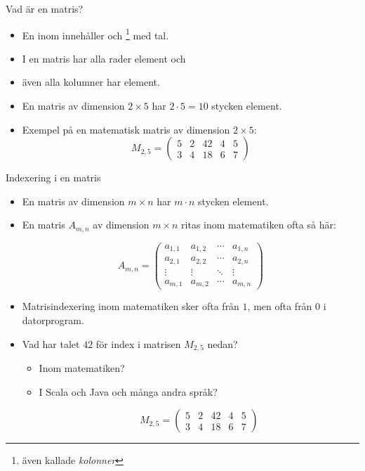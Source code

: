 \begin{Slide}{Vad är en matris?}\SlideFontSmall
\begin{itemize}

\item En  inom  innehåller  och \footnote{även kallade \emph{kolonner}} med tal.

\item I en  matris har alla rader  element och

\item även alla kolumner har  element.

\item En matris av dimension $2\times{}5$ har $2 \cdot 5 = 10$ stycken element.

\item Exempel på en matematisk matris av dimension $2\times{}5$:
\[
M_{2,5}=
  \begin{pmatrix}
    5 & 2 & 42 & 4 & 5 \\
    3 & 4 & 18 & 6 & 7
  \end{pmatrix}
\]
\end{itemize}
\end{Slide}

\begin{Slide}{Indexering i en matris}\SlideFontSmall
\begin{itemize}

  \item En matris av dimension $m\times{}n$ har $m \cdot n$ stycken element.

  \item En matris $A_{m,n}$ av dimension $m\times{}n$ ritas inom matematiken ofta så här:

  \[
  A_{m,n} =
   \begin{pmatrix}
    a_{1,1} & a_{1,2} & \cdots & a_{1,n} \\
    a_{2,1} & a_{2,2} & \cdots & a_{2,n} \\
    \vdots  & \vdots  & \ddots & \vdots  \\
    a_{m,1} & a_{m,2} & \cdots & a_{m,n}
   \end{pmatrix}
  \]


\item Matrisindexering inom matematiken sker ofta från $1$, men ofta från $0$ i datorprogram.

\item Vad har talet $42$ för index i matrisen $M_{2,5}$ nedan?
\begin{itemize}\SlideFontTiny
  \item[--] Inom matematiken?
  \item[--] I Scala och Java och många andra språk?

  \[
  M_{2,5}=
    \begin{pmatrix}
      5 & 2 & 42 & 4 & 5 \\
      3 & 4 & 18 & 6 & 7
    \end{pmatrix}
  \]
\end{itemize}
\end{itemize}
\end{Slide}

